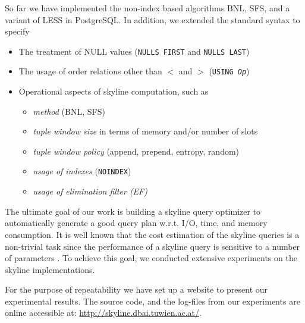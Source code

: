 So far we have implemented the non-index based algorithms
BNL, SFS, and a variant of LESS in PostgreSQL.
In addition, 
we extended the standard syntax to specify
\begin{itemize}
\item The treatment of NULL values (\texttt{NULLS FIRST} and \texttt{NULLS LAST})
\item The usage of order relations other than $<$ and $>$ (\texttt{USING \emph{Op}})
\item Operational aspects of skyline computation, such as 
\begin{itemize}
\item \emph{method} (BNL, SFS)
\item \emph{tuple window size} in terms of memory and/or number of slots
\item \emph{tuple window policy} (append, prepend, entropy, random)
\item \emph{usage of indexes} (\texttt{NOINDEX})
\item \emph{usage of elimination filter (EF)}
\end{itemize}
\end{itemize}

The ultimate goal of our work is building a skyline query optimizer to
automatically generate a good query plan w.r.t. I/O, time, and memory
consumption.  It is well known that the cost estimation of the skyline
queries is a non-trivial task \citep{Chaudhuri2006} since the
performance of a skyline query is sensitive to a number of parameters
\citep{Godfrey2007}.  To achieve this goal, we conducted extensive
experiments on the skyline implementations.

For the purpose of repeatability we have set up a website to present
our experimental results. The source code, and the log-files from our
experiments are online accessible at:
\url{http://skyline.dbai.tuwien.ac.at/}.


